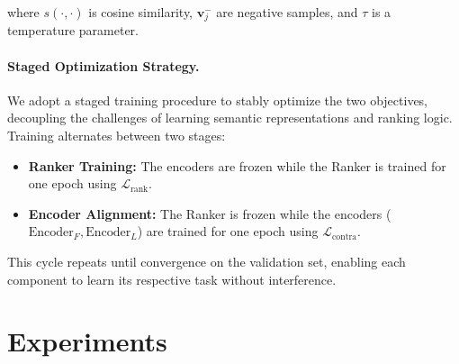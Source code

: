 \documentclass[letterpaper]{article} %
\begin{document}
where $s(\cdot, \cdot)$ is cosine similarity, $\mathbf{v}_j^{-}$ are negative samples, and $\tau$ is a temperature parameter.

\paragraph{Staged Optimization Strategy.}
We adopt a staged training procedure to stably optimize the two objectives, decoupling the challenges of learning semantic representations and ranking logic. Training alternates between two stages:
\begin{itemize}
    \item \textbf{Ranker Training:} The encoders are frozen while the Ranker is trained for one epoch using \(\mathcal{L}_{\text{rank}}\).
    \item \textbf{Encoder Alignment:} The Ranker is frozen while the encoders (\(\text{Encoder}_F, \text{Encoder}_L\)) are trained for one epoch using \(\mathcal{L}_{\text{contra}}\).
\end{itemize}
This cycle repeats until convergence on the validation set, enabling each component to learn its respective task without interference.


\section{Experiments}
\end{document}
